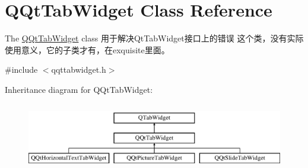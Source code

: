 \hypertarget{class_q_qt_tab_widget}{}\section{Q\+Qt\+Tab\+Widget Class Reference}
\label{class_q_qt_tab_widget}


The \mbox{\hyperlink{class_q_qt_tab_widget}{Q\+Qt\+Tab\+Widget}} class 用于解决\+Qt\+Tab\+Widget接口上的错误 这个类，没有实际使用意义，它的子类才有，在exquisite里面。  




{\ttfamily \#include $<$qqttabwidget.\+h$>$}

Inheritance diagram for Q\+Qt\+Tab\+Widget\+:\begin{figure}[H]
\begin{center}
\leavevmode
\includegraphics[height=3.000000cm]{class_q_qt_tab_widget}
\end{center}
\end{figure}
